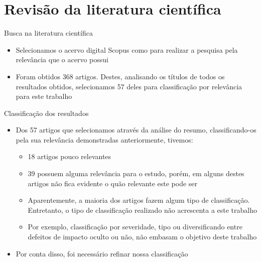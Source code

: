 \documentclass[brazilian]{beamer}
\begin{document}
\section{Revisão da literatura científica}


\begin{frame}{Busca na literatura científica}
    \begin{itemize}
        \item Selecionamos o acervo digital Scopus como para realizar a pesquisa pela relevância que o acervo possui
        \item Foram obtidos 368 artigos. Destes, analisando os títulos de todos os resultados obtidos, selecionamos 57 deles para classificação por relevância para este trabalho
    \end{itemize}
\end{frame}

\begin{frame}{Classificação dos resultados}
    \begin{itemize}
        \item Dos 57 artigos que selecionamos através da análise do resumo, classificando-os pela sua relevância demonstradas anteriormente, tivemos:
            \begin{itemize}
                \item 18 artigos pouco relevantes
                \item 39 possuem alguma relevância para o estudo, porém, em alguns destes artigos não fica evidente o quão relevante este pode ser
                \item Aparentemente, a maioria dos artigos fazem algum tipo de classificação. Entretanto, o tipo de classificação realizado não acrescenta a este trabalho 
                \item Por exemplo, classificação por severidade, tipo ou diversificando entre defeitos de impacto oculto ou não, não embasam o objetivo deste trabalho
            \end{itemize}
        \item Por conta disso, foi necessário refinar nossa classificação
    \end{itemize}
\end{frame}
\end{document}
